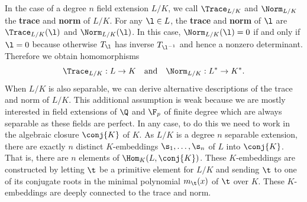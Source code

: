     In the case of a degree \(n\) field extension \(L/K\), we call \(\Trace_{L/K}\) and \(\Norm_{L/K}\) the \textbf{trace} and \textbf{norm} of \(L/K\). For any \(\l \in L\), the \textbf{trace} and \textbf{norm} of \(\l\) are \(\Trace_{L/K}(\l)\) and \(\Norm_{L/K}(\l)\). In this case, \(\Norm_{L/K}(\l) = 0\) if and only if \(\l = 0\) because otherwise \(T_{\l}\) has inverse \(T_{\l^{-1}}\) and hence a nonzero determinant. Therefore we obtain homomorphisms
    \[
      \Trace_{L/K}:L \to K \quad \text{and} \quad \Norm_{L/K}:L^{\ast} \to K^{\ast}.
    \]
    When \(L/K\) is also separable, we can derive alternative descriptions of the trace and norm of \(L/K\). This additional assumption is weak because we are mostly interested in field extensions of \(\Q\) and \(\F_{p}\) of finite degree which are always separable as these fields are perfect. In any case, to do this we need to work in the algebraic closure \(\conj{K}\) of \(K\). As \(L/K\) is a degree \(n\) separable extension, there are exactly \(n\) distinct \(K\)-embeddings \(\s_{1},\ldots,\s_{n}\) of \(L\) into \(\conj{K}\). That is, there are \(n\) elements of \(\Hom_{K}(L,\conj{K})\). These \(K\)-embeddings are constructed by letting \(\t\) be a primitive element for \(L/K\) and sending \(\t\) to one of its conjugate roots in the minimal polynomial \(m_{\t}(x)\) of \(\t\) over \(K\). These \(K\)-embeddings are deeply connected to the trace and norm.

